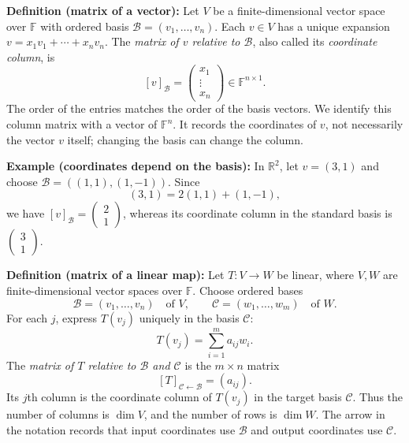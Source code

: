 \documentclass[a4paper,11pt,abstract=true]{scrartcl}
\theoremstyle{dotlessP}
\theoremstyle{dotlessS}
\theoremstyle{remark}
\theoremstyle{definition}
\begin{document}
\begin{claim_box}
\textbf{Definition (matrix of a vector):} Let $V$ be a
finite-dimensional vector space over $\mathbb{F}$ with ordered basis
$\mathcal{B}=(v_1,\ldots,v_n)$. Each $v\in V$ has a unique expansion
$v=x_1 v_1+\cdots+x_n v_n$. The \emph{matrix of $v$ relative to
$\mathcal{B}$}, also called its \emph{coordinate column}, is
\[
{[v]}_{\mathcal{B}}=
\begin{pmatrix}x_1\\\vdots\\x_n\end{pmatrix}
\in\mathbb{F}^{n\times1}.
\]
The order of the entries matches the order of the basis vectors.
We identify this column matrix with a vector of $\mathbb{F}^n$.
It records the coordinates of $v$, not necessarily the vector $v$
itself; changing the basis can change the column.
\end{claim_box}

\begin{example_box}
\textbf{Example (coordinates depend on the basis):} In
$\mathbb{R}^2$, let $v=(3,1)$ and choose
$\mathcal{B}=((1,1),(1,-1))$. Since
\[
(3,1)=2(1,1)+(1,-1),
\]
we have ${[v]}_{\mathcal{B}}=\begin{pmatrix}2\\1\end{pmatrix}$,
whereas its coordinate column in the standard basis is
$\begin{pmatrix}3\\1\end{pmatrix}$.
\end{example_box}

\begin{definition_box}
\textbf{Definition (matrix of a linear map):} Let
$T:V\longrightarrow W$ be linear, where $V,W$ are finite-dimensional
vector spaces over $\mathbb{F}$. Choose ordered bases
\[
\mathcal{B}=(v_1,\ldots,v_n)\quad\text{of }V,
\qquad \mathcal{C}=(w_1,\ldots,w_m)\quad\text{of }W.
\]
For each $j$, express $T(v_j)$ uniquely in the basis $\mathcal{C}$:
\[
T(v_j)=\sum_{i=1}^m a_{ij}w_i.
\]
The \emph{matrix of $T$ relative to $\mathcal{B}$ and $\mathcal{C}$} is
the $m\times n$ matrix
\[
{[T]}_{\mathcal{C}\leftarrow\mathcal{B}}=(a_{ij}).
\]
Its $j$th column is the coordinate column of $T(v_j)$ in the target
basis $\mathcal{C}$. Thus the number of columns is $\dim V$, and the
number of rows is $\dim W$. The arrow in the notation records that
input coordinates use $\mathcal{B}$ and output coordinates use
$\mathcal{C}$.
\end{definition_box}
\end{document}
